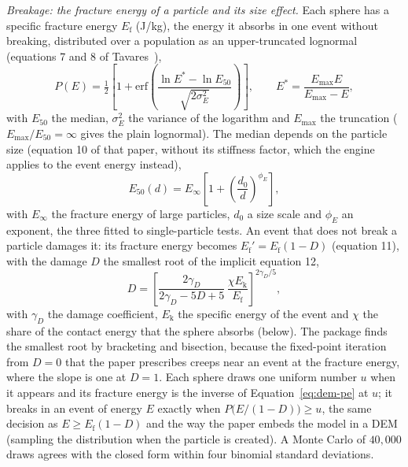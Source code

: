 \emph{Breakage: the fracture energy of a particle and its size effect.} Each sphere has a specific fracture energy $E_{\mathrm f}$ (J/kg), the energy it absorbs in one event without breaking, distributed over a
population as an upper-truncated lognormal (equations 7 and 8 of Tavares~\cite{tavares2022}),
\begin{equation}
P(E)=\tfrac12\left[1+\mathrm{erf}\!\left(\frac{\ln E^{\ast}-\ln E_{50}}{\sqrt{2\sigma_E^2}}\right)\right],\qquad E^{\ast}=\frac{E_{\max}E}{E_{\max}-E},
\label{eq:dem-pe}
\end{equation}
with $E_{50}$ the median, $\sigma_E^2$ the variance of the logarithm and $E_{\max}$ the truncation ($E_{\max}/E_{50}=\infty$ gives the plain lognormal). The median depends on the particle size
(equation 10 of that paper, without its stiffness factor, which the engine applies to the event energy instead),
\begin{equation}
E_{50}(d)=E_{\infty}\left[1+\left(\frac{d_0}{d}\right)^{\phi_E}\right],
\label{eq:dem-e50}
\end{equation}
with $E_{\infty}$ the fracture energy of large particles, $d_0$ a size scale and $\phi_E$ an exponent, the three fitted to single-particle tests. An event that does not break a particle damages it: its fracture energy becomes $E_{\mathrm f}'=E_{\mathrm f}(1-D)$ (equation 11), with the damage
$D$ the smallest root of the implicit equation 12,
\begin{equation}
D=\left[\frac{2\gamma_D}{2\gamma_D-5D+5}\,\frac{\chi E_{\mathrm k}}{E_{\mathrm f}}\right]^{2\gamma_D/5},
\label{eq:dem-damage}
\end{equation}
with $\gamma_D$ the damage coefficient, $E_{\mathrm k}$ the specific energy of the event and $\chi$ the share of the contact energy that the sphere absorbs (below). The package finds the smallest root by bracketing and
bisection, because the fixed-point iteration from $D=0$ that the paper prescribes creeps near an event at the fracture energy, where the slope is one at $D=1$. Each sphere draws one uniform number $u$ when it
appears and its fracture energy is the inverse of Equation~\eqref{eq:dem-pe} at $u$; it breaks in an event of energy $E$ exactly when $P\big(E/(1-D)\big)\ge u$, the same decision as $E\ge E_{\mathrm f}(1-D)$ and the way the paper embeds the model in a DEM
(sampling the distribution when the particle is created). A Monte Carlo of $40{,}000$ draws agrees with the closed form within four binomial standard deviations.

